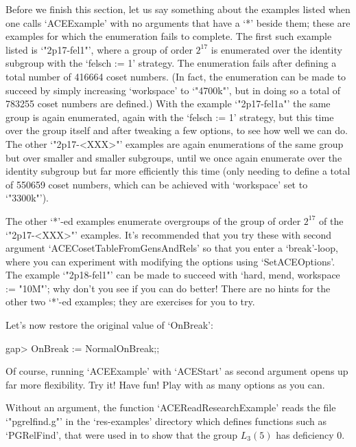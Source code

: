 Before we finish this section, let us say something about the examples
listed when one calls `ACEExample' with no arguments that have  a  `*'
beside them; these are examples for which  the  enumeration  fails  to
complete. The first such example  listed  is  `"2p17-fel1"',  where  a
group of order $2^{17}$ is enumerated over the identity subgroup  with
the `felsch := 1' strategy. The enumeration  fails  after  defining  a
total number of 416664 coset numbers. (In fact, the enumeration can be
made to succeed by simply increasing `workspace' to `"4700k"', but  in
doing so a total of  783255  coset  numbers  are  defined.)  With  the
example `"2p17-fel1a"' the same group is again enumerated, again  with
the `felsch := 1' strategy, but this time over the  group  itself  and
after tweaking a few options, to see how well we  can  do.  The  other
`"2p17-<XXX>"' examples are again enumerations of the same  group  but
over smaller and smaller subgroups, until we once again enumerate over
the identity subgroup but far more efficiently this time (only needing
to define a total of 550659 coset numbers, which can be achieved  with
`workspace' set to `"3300k"').

The other `*'-ed examples enumerate overgroups of the group  of  order
$2^{17}$ of the `"2p17-<XXX>"' examples. It's recommended that you try
these with second argument `ACECosetTableFromGensAndRels' so that  you
enter a `break'-loop, where you  can  experiment  with  modifying  the
options using `SetACEOptions'. The example `"2p18-fel1"' can  be  made
to succeed with `hard, mend, workspace := "10M"'; why don't you see if
you can do better! There  are  no  hints  for  the  other  two  `*'-ed
examples; they are exercises for you to try.

Let's now restore the original value of `OnBreak':

\beginexample
gap> OnBreak := NormalOnBreak;;
\endexample

Of course, running `ACEExample' with  `ACEStart'  as  second  argument
opens up far more flexibility. Try it! Have fun!  Play  with  as  many
options as you can. 


Without an argument, the function `ACEReadResearchExample'  reads  the
file `"pgrelfind.g"' in the  `res-examples'  directory  which  defines
{\GAP} functions such as `PGRelFind', that were used in  \cite{CHHR01}
to show that the group $L_3(5)$ has deficiency 0.
%

